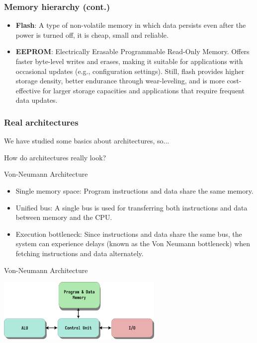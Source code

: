 \documentclass[aspectratio=169]{beamer}
\begin{document}
\begin{frame}
  \frametitle{Memory hierarchy (cont.)}
  \begin{itemize}
    \item <1-> \textbf{Flash}: A type of non-volatile memory in which data persists even after the power is turned off, it is cheap, small and reliable.
    \item <2-> \textbf{EEPROM}: Electrically Erasable Programmable Read-Only Memory. Offers faster byte-level writes and erases, making it suitable for applications with occasional updates (e.g., configuration settings). Still, flash provides higher storage density, better endurance through wear-leveling, and is more cost-effective for larger storage capacities and applications that require frequent data updates.
  \end{itemize}
\end{frame}

\begin{frame}
  \frametitle{Real architectures}
  We have studied some basics about architectures, so... \pause
  \begin{block}
    How do architectures really look?
  \end{block}
\end{frame}

\begin{frame}{Von-Neumann Architecture}
  \begin{itemize}
      \item <1-> Single memory space: Program instructions and data share the same memory.
      \item <2-> Unified bus: A single bus is used for transferring both instructions and data between memory and the CPU.
      \item <3-> Execution bottleneck: Since instructions and data share the same bus, the system can experience delays (known as the Von Neumann bottleneck) when fetching instructions and data alternately.
  \end{itemize}
\end{frame}

\begin{frame}{Von-Neumann Architecture}
\begin{center}
  \includegraphics[width=0.6\textwidth]{assets/von_neumann_arch.png}  
\end{center}
\end{frame}
\end{document}
